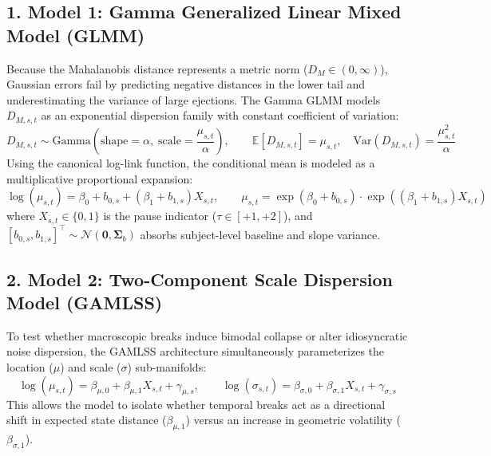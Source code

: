 \documentclass[11pt,twoside,a4paper]{article}
\begin{document}
\subsection{1. Model 1: Gamma Generalized Linear Mixed Model (GLMM)}
Because the Mahalanobis distance represents a metric norm ($D_M \in (0, \infty)$), Gaussian errors fail by predicting negative distances in the lower tail and underestimating the variance of large ejections. The Gamma GLMM models $D_{M,s,t}$ as an exponential dispersion family with constant coefficient of variation:
\begin{equation}
D_{M,s,t} \sim \text{Gamma}\left( \text{shape} = \alpha, \; \text{scale} = \frac{\mu_{s,t}}{\alpha} \right), \qquad \mathbb{E}[D_{M,s,t}] = \mu_{s,t}, \quad \text{Var}(D_{M,s,t}) = \frac{\mu_{s,t}^2}{\alpha}
\end{equation}
Using the canonical log-link function, the conditional mean is modeled as a multiplicative proportional expansion:
\begin{equation}
\log(\mu_{s,t}) = \beta_0 + b_{0,s} + (\beta_1 + b_{1,s}) X_{s,t}, \qquad \mu_{s,t} = \exp(\beta_0 + b_{0,s}) \cdot \exp((\beta_1 + b_{1,s}) X_{s,t})
\end{equation}
where $X_{s,t} \in \{0, 1\}$ is the pause indicator ($\tau \in [+1, +2]$), and $[b_{0,s}, b_{1,s}]^\top \sim \mathcal{N}(\mathbf{0}, \boldsymbol{\Sigma}_b)$ absorbs subject-level baseline and slope variance.

\subsection{2. Model 2: Two-Component Scale Dispersion Model (GAMLSS)}
To test whether macroscopic breaks induce bimodal collapse or alter idiosyncratic noise dispersion, the GAMLSS architecture simultaneously parameterizes the location ($\mu$) and scale ($\sigma$) sub-manifolds:
\begin{equation}
\log(\mu_{s,t}) = \beta_{\mu,0} + \beta_{\mu,1} X_{s,t} + \gamma_{\mu,s}, \qquad \log(\sigma_{s,t}) = \beta_{\sigma,0} + \beta_{\sigma,1} X_{s,t} + \gamma_{\sigma,s}
\end{equation}
This allows the model to isolate whether temporal breaks act as a directional shift in expected state distance ($\beta_{\mu,1}$) versus an increase in geometric volatility ($\beta_{\sigma,1}$).
\end{document}
